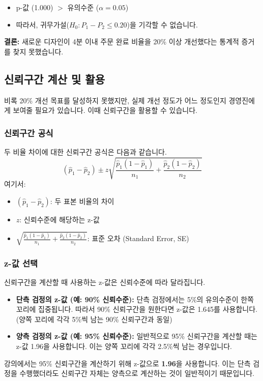 \documentclass[11pt,a4paper]{article}
\theoremstyle{definition}
\begin{document}
\begin{summarybox}[title=p-값 해석:]
\begin{itemize}
    \item p-값 (1.000) $>$ 유의수준 ($\alpha=0.05$)
    \item 따라서, 귀무가설($H_0: P_1 - P_2 \le 0.20$)을 기각할 수 없습니다.
\end{itemize}
\textbf{결론:} 새로운 디자인이 4분 이내 주문 완료 비율을 20\% 이상 개선했다는 통계적 증거를 찾지 못했습니다.
\end{summarybox}

\subsection{신뢰구간 계산 및 활용}

비록 20\% 개선 목표를 달성하지 못했지만, 실제 개선 정도가 어느 정도인지 경영진에게 보여줄 필요가 있습니다. 이때 신뢰구간을 활용할 수 있습니다.

\subsubsection{신뢰구간 공식}
두 비율 차이에 대한 신뢰구간 공식은 다음과 같습니다.
$$ (\hat{p}_1 - \hat{p}_2) \pm z \sqrt{\frac{\hat{p}_1(1-\hat{p}_1)}{n_1} + \frac{\hat{p}_2(1-\hat{p}_2)}{n_2}} $$
여기서:
\begin{itemize}
    \item $(\hat{p}_1 - \hat{p}_2)$: 두 표본 비율의 차이
    \item $z$: 신뢰수준에 해당하는 z-값
    \item $\sqrt{\frac{\hat{p}_1(1-\hat{p}_1)}{n_1} + \frac{\hat{p}_2(1-\hat{p}_2)}{n_2}}$: 표준 오차 (Standard Error, SE)
\end{itemize}

\subsubsection{z-값 선택}
신뢰구간을 계산할 때 사용하는 z-값은 신뢰수준에 따라 달라집니다.
\begin{itemize}
    \item \textbf{단측 검정의 z-값 (예: 90\% 신뢰수준):} 단측 검정에서는 5\%의 유의수준이 한쪽 꼬리에 집중됩니다. 따라서 90\% 신뢰구간을 원한다면 z-값은 1.645를 사용합니다. (양쪽 꼬리에 각각 5\%씩 남는 90\% 신뢰구간과 동일)
    \item \textbf{양측 검정의 z-값 (예: 95\% 신뢰수준):} 일반적으로 95\% 신뢰구간을 계산할 때는 z-값 1.96을 사용합니다. 이는 양쪽 꼬리에 각각 2.5\%씩 남는 경우입니다.
\end{itemize}
강의에서는 95\% 신뢰구간을 계산하기 위해 z-값으로 \textbf{1.96}을 사용합니다. 이는 단측 검정을 수행했더라도 신뢰구간 자체는 양측으로 계산하는 것이 일반적이기 때문입니다.
\end{document}
